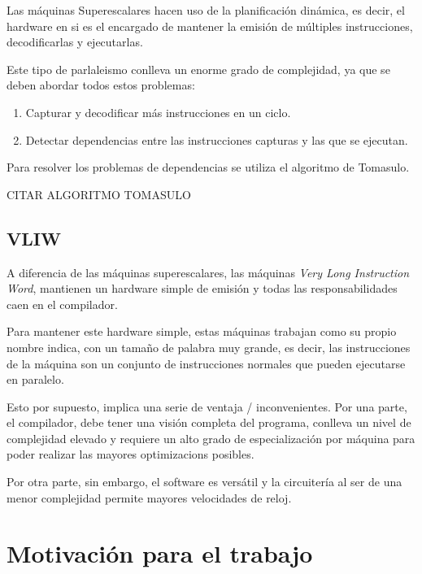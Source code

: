 Las máquinas Superescalares hacen uso de la planificación dinámica, es decir, el hardware 
en si es el encargado de mantener la emisión de múltiples instrucciones, decodificarlas y 
ejecutarlas.

\bigskip
Este tipo de parlaleismo conlleva un enorme grado de complejidad, ya que se deben abordar 
todos estos problemas:

\begin{enumerate}

\item Capturar y decodificar más instrucciones en un ciclo.

\item Detectar dependencias entre las instrucciones capturas y las que se ejecutan.

\end{enumerate}

\bigskip
Para resolver los problemas de dependencias se utiliza el algoritmo de Tomasulo.

CITAR ALGORITMO TOMASULO 

\subsection{VLIW}

A diferencia de las máquinas superescalares, las máquinas \textit{Very Long Instruction Word},
mantienen un hardware simple de emisión y todas las responsabilidades caen en el compilador.

\bigskip
Para mantener este hardware simple, estas máquinas trabajan como su propio nombre indica, con
un tamaño de palabra muy grande, es decir, las instrucciones de la máquina son un conjunto
de instrucciones normales que pueden ejecutarse en paralelo.

\bigskip
Esto por supuesto, implica una serie de ventaja / inconvenientes. Por una parte, el compilador,
debe tener una visión completa del programa, conlleva un nivel de complejidad elevado y requiere
un alto grado de especialización por máquina para poder realizar las mayores optimizacions posibles.

\bigskip
Por otra parte, sin embargo, el software es versátil y la circuitería al ser de una menor complejidad 
permite mayores velocidades de reloj.

\section{Motivación para el trabajo}
\label{1:sec:3}


